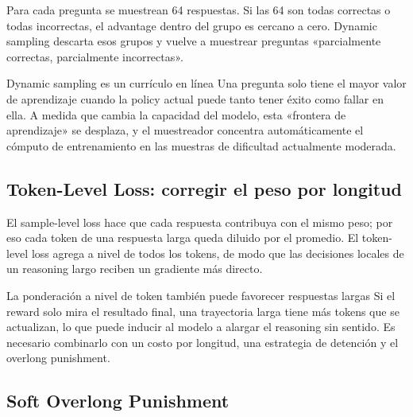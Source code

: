 Para cada pregunta se muestrean 64 respuestas. Si las 64 son todas correctas o todas incorrectas, el advantage dentro del grupo es cercano a cero. Dynamic sampling descarta esos grupos y vuelve a muestrear preguntas «parcialmente correctas, parcialmente incorrectas».


\begin{knowledgebox}{Dynamic sampling es un currículo en línea}
Una pregunta solo tiene el mayor valor de aprendizaje cuando la policy actual puede tanto tener éxito como fallar en ella. A medida que cambia la capacidad del modelo, esta «frontera de aprendizaje» se desplaza, y el muestreador concentra automáticamente el cómputo de entrenamiento en las muestras de dificultad actualmente moderada.
\end{knowledgebox}

\subsection{Token-Level Loss: corregir el peso por longitud}

El sample-level loss hace que cada respuesta contribuya con el mismo peso; por eso cada token de una respuesta larga queda diluido por el promedio. El token-level loss agrega a nivel de todos los tokens, de modo que las decisiones locales de un reasoning largo reciben un gradiente más directo.


\begin{warningbox}{La ponderación a nivel de token también puede favorecer respuestas largas}
Si el reward solo mira el resultado final, una trayectoria larga tiene más tokens que se actualizan, lo que puede inducir al modelo a alargar el reasoning sin sentido. Es necesario combinarlo con un costo por longitud, una estrategia de detención y el overlong punishment.
\end{warningbox}

\subsection{Soft Overlong Punishment}

